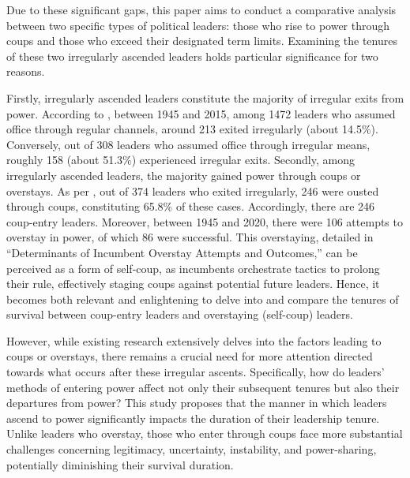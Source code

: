 \documentclass[
  12pt,
  a4paper,
  12pt]{article}
\begin{document}
Due to these significant gaps, this paper aims to conduct a comparative
analysis between two specific types of political leaders: those who rise
to power through coups and those who exceed their designated term
limits. Examining the tenures of these two irregularly ascended leaders
holds particular significance for two reasons.

Firstly, irregularly ascended leaders constitute the majority of
irregular exits from power. According to \citep{goemans2009}, between
1945 and 2015, among 1472 leaders who assumed office through regular
channels, around 213 exited irregularly (about 14.5\%). Conversely, out
of 308 leaders who assumed office through irregular means, roughly 158
(about 51.3\%) experienced irregular exits. Secondly, among irregularly
ascended leaders, the majority gained power through coups or overstays.
As per \citep{goemans2009}, out of 374 leaders who exited irregularly,
246 were ousted through coups, constituting 65.8\% of these cases.
Accordingly, there are 246 coup-entry leaders. Moreover, between 1945
and 2020, there were 106 attempts to overstay in power, of which 86 were
successful. This overstaying, detailed in ``Determinants of Incumbent
Overstay Attempts and Outcomes,'' can be perceived as a form of
self-coup, as incumbents orchestrate tactics to prolong their rule,
effectively staging coups against potential future leaders. Hence, it
becomes both relevant and enlightening to delve into and compare the
tenures of survival between coup-entry leaders and overstaying
(self-coup) leaders.

However, while existing research extensively delves into the factors
leading to coups or overstays, there remains a crucial need for more
attention directed towards what occurs after these irregular ascents.
Specifically, how do leaders' methods of entering power affect not only
their subsequent tenures but also their departures from power? This
study proposes that the manner in which leaders ascend to power
significantly impacts the duration of their leadership tenure. Unlike
leaders who overstay, those who enter through coups face more
substantial challenges concerning legitimacy, uncertainty, instability,
and power-sharing, potentially diminishing their survival duration.

 
  \providecommand{\huxb}[2]{\arrayrulecolor[RGB]{#1}\global\arrayrulewidth=#2pt}
  \providecommand{\huxvb}[2]{\color[RGB]{#1}\vrule width #2pt}
  \providecommand{\huxtpad}[1]{\rule{0pt}{#1}}
  \providecommand{\huxbpad}[1]{\rule[-#1]{0pt}{#1}}
\end{document}

